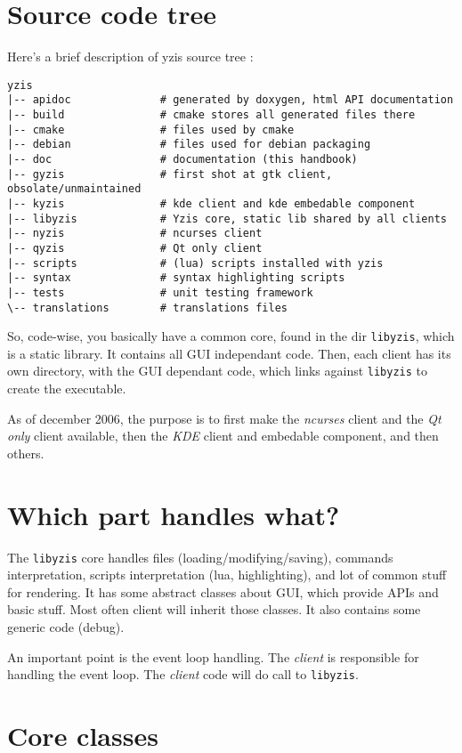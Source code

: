 \documentclass[a4paper,12pt]{report}
\begin{document}
\section{Source code tree}
Here's a brief description of yzis source tree :
\begin{verbatim}
yzis
|-- apidoc              # generated by doxygen, html API documentation
|-- build               # cmake stores all generated files there
|-- cmake               # files used by cmake
|-- debian              # files used for debian packaging
|-- doc                 # documentation (this handbook)
|-- gyzis               # first shot at gtk client, obsolate/unmaintained
|-- kyzis               # kde client and kde embedable component
|-- libyzis             # Yzis core, static lib shared by all clients
|-- nyzis               # ncurses client
|-- qyzis               # Qt only client
|-- scripts             # (lua) scripts installed with yzis
|-- syntax              # syntax highlighting scripts
|-- tests               # unit testing framework
\-- translations        # translations files
\end{verbatim}

So, code-wise, you basically have a common core, found in the dir
\verb+libyzis+, which is a static library. It contains all GUI independant
code. Then, each client has its own directory, with the GUI dependant code,
which links against \verb+libyzis+ to create the executable.

As of december 2006, the purpose is to first make the \emph{ncurses} client
and the \emph{Qt only} client available, then the \emph{KDE} client and
embedable component, and then others.

\section{Which part handles what?}

The \verb+libyzis+ core handles files (loading/modifying/saving), commands
interpretation, scripts interpretation (lua, highlighting), and lot of
common stuff for rendering.
It has some abstract classes about GUI, which provide APIs and basic stuff.
Most often client will inherit those classes.
It also contains some generic code (debug).

An important point is the event loop handling. The \emph{client} is
responsible for handling the event loop. The \emph{client} code will do
call to \verb+libyzis+.

\section{Core classes}
\end{document}

